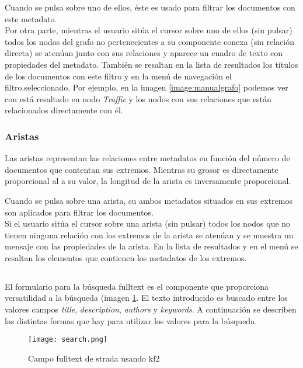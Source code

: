 Cuando se pulsa sobre uno de ellos, éste es usado para filtrar los documentos con este \gls{metadato}.\\

Por otra parte, mientras el usuario sitúa el cursor sobre uno de ellos (sin pulsar) todos los nodos del grafo no pertenecientes a su componente conexa (sin relación directa) se atenúan junto con sus relaciones y aparece un cuadro de texto con propiedades del \gls{metadato}. También se resaltan en la lista de resultados los títulos de los documentos con este filtro y en la menú de navegación el filtro.seleccionado. Por ejemplo, en la imagen \ref{image:manualgrafo} podemos ver con está resaltado en nodo \textit{Traffic} y los nodos con sus relaciones que están relacionados directamente con él. 

\subsubsection{Aristas}
Las aristas representan las relaciones entre \glspl{metadato} en función del número de documentos que contentan sus extremos. Mientras su grosor es directamente proporcional al a su valor, la longitud de la arista es inversamente proporcional.

Cuando se pulsa sobre una arista, su ambos \glspl{metadato} situados en sus extremos son aplicados para filtrar los documentos.\\

Si el usuario sitúa el cursor sobre una arista (sin pulsar) todos los nodos que no tienen ninguna relación con los extremos de la arista se atenúan y se muestra un mensaje con las propiedades de la arista. En la lista de resultados y en el menú se resaltan los elementos que contienen los \glspl{metadato} de los extremos.

\subsection{\fulltext}
El formulario para la búsqueda \gls{fulltext} es el componente que proporciona versatilidad a la búsqueda (imagen \ref{image:manualfulltext}. El texto introducido es buscado entre los valores campos \textit{title}, \textit{description}, \textit{authors} y \textit{keywords}. A continuación se describen las distintas formas que hay para utilizar los valores para la búsqueda.

\begin{figure}[h!]
  \centering
  	\texttt{[image: search.png]}
  \caption{Campo \gls{fulltext} de \gls{strada} usando \gls{kf2}}
  \label{image:manualfulltext}
\end{figure}
